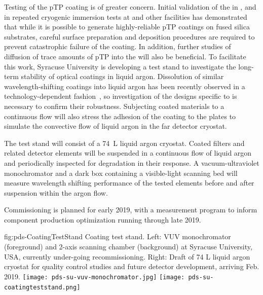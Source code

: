 Testing of the pTP coating is of greater concern.  Initial validation of the  in ,  and in repeated cryogenic immersion tests at  and other facilities has demonstrated that while it is possible to generate highly-reliable pTP coatings on fused silica substrates, careful surface preparation and deposition procedures are required to prevent catastrophic failure of the coating.  In addition, further studies of diffusion of trace amounts of pTP into the  will also be beneficial.  To facilitate this work,  
Syracuse University is 
 developing a test stand to investigate the long-term stability of  optical coatings in liquid argon. Dissolution of similar wavelength-shifting coatings into liquid argon has been recently observed in a technology-dependent fashion~\cite{Asaadi:2018ixs}, so investigation of the designs specific to  is necessary to confirm their robustness. Subjecting coated materials to a continuous flow will also stress the adhesion of the coating to the plates to simulate the convective flow of liquid argon in the far detector cryostat.

The test stand will consist of a \SI{74}{L} liquid argon cryostat. Coated filters and related detector elements will be suspended in a continuous flow of liquid argon and periodically inspected for degradation in their response. A vacuum-ultraviolet monochromator and a dark box containing a visible-light scanning bed will measure wavelength shifting performance of the tested elements before and after suspension within the argon flow.


 Commissioning is planned for early 2019, with a measurement program to inform component production optimization running through late 2019. 
 
 

\begin{dunefigure}
 {fig:pds-CoatingTestStand}
 { Coating test stand. Left: VUV monochromator (foreground) and 2-axis scanning chamber (background) at Syracuse University, USA, currently under-going recommissioning. Right: Draft of 74 L liquid argon cryostat for quality control studies and future detector development, arriving Feb. 2019.}
\texttt{[image: pds-su-vuv-monochromator.jpg]}
\hspace{0.02\textwidth}
\texttt{[image: pds-su-coatingteststand.png]}
\end{dunefigure}

